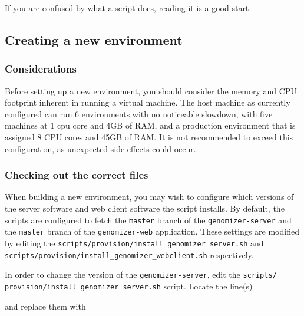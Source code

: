 If you are confused by what a script does, reading it is a good start.

\subsection{Creating a new
environment}\label{creating-a-new-environment}

\subsubsection{Considerations}\label{considerations}

Before setting up a new environment, you should consider the memory and
CPU footprint inherent in running a virtual machine. The host machine as
currently configured can run 6 environments with no noticeable slowdown,
with five machines at 1 cpu core and 4GB of RAM, and a production
environment that is assigned 8 CPU cores and 45GB of RAM. It is not
recommended to exceed this configuration, as unexpected side-effects
could occur.

\subsubsection{Checking out the correct
files}\label{checking-out-the-correct-files}

When building a new environment, you may wish to configure which
versions of the server software and web client software the script
installs. By default, the scripts are configured to fetch the
\texttt{master} branch of the \texttt{genomizer-server} and the
\texttt{master} branch of the \texttt{genomizer-web} application. These
settings are modified by editing the
\texttt{scripts/provision/install\_genomizer\_server.sh} and
\texttt{scripts/provision/install\_genomizer\_webclient.sh}
respectively.

In order to change the version of the \texttt{genomizer-server}, edit
the \texttt{scripts/
provision/install\_genomizer\_server.sh} script.
Locate the line(s)

\begin{Shaded}
\begin{Highlighting}[numbers=left,,]
 
\end{Highlighting}
\end{Shaded}

and replace them with

